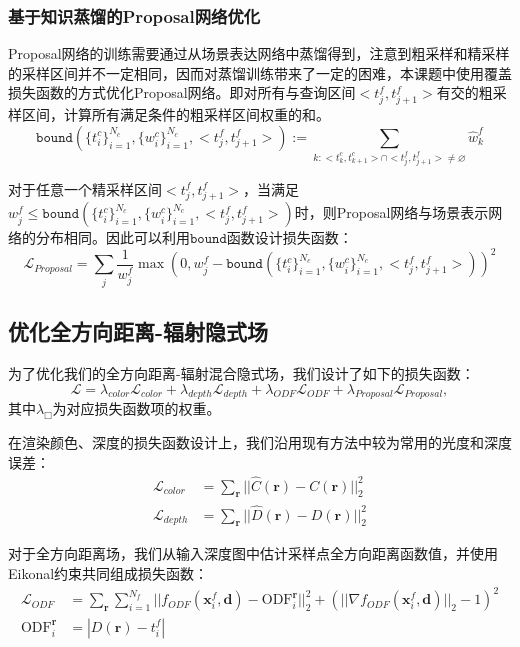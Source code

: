 \subsubsection{基于知识蒸馏的Proposal网络优化}

Proposal网络的训练需要通过从场景表达网络中蒸馏得到，注意到粗采样和精采样的采样区间并不一定相同，因而对蒸馏训练带来了一定的困难，本课题中使用覆盖损失函数的方式优化Proposal网络\cite{barron_mip-nerf_2022}。即对所有与查询区间$<t_{j}^f, t_{j+1}^f>$有交的粗采样区间，计算所有满足条件的粗采样区间权重的和。
\begin{equation}
    \mathtt{bound}(\{t_i^c\}_{i=1}^{N_c}, \{w_i^c\}_{i=1}^{N_c}, <t_{j}^f, t_{j+1}^f>) :=\sum_{k:<t_{k}^c,t_{k+1}^c>\cap<t_{j}^f, t_{j+1}^f>\neq\varnothing}\hat{w}_k^f
\end{equation}

对于任意一个精采样区间$<t_{j}^f, t_{j+1}^f>$，当满足$w_j^f\leq \mathtt{bound}(\{t_i^c\}_{i=1}^{N_c}, \{w_i^c\}_{i=1}^{N_c}, <t_{j}^f, t_{j+1}^f>)$时，则Proposal网络与场景表示网络的分布相同。因此可以利用$\mathtt{bound}$函数设计损失函数：
\begin{equation}
    \mathcal{L}_{Proposal}=\sum_j\frac{1}{w_j^f}\max(0, w_j^f- \mathtt{bound}(\{t_i^c\}_{i=1}^{N_c}, \{w_i^c\}_{i=1}^{N_c}, <t_{j}^f, t_{j+1}^f>))^2
\end{equation}

\subsection{优化全方向距离-辐射隐式场}
为了优化我们的全方向距离-辐射混合隐式场，我们设计了如下的损失函数：
\begin{equation}
    \mathcal{L} = \lambda_{color}\mathcal{L}_{color} + \lambda_{depth}\mathcal{L}_{depth}+\lambda_{ODF}\mathcal{L}_{ODF}+\lambda_{Proposal}\mathcal{L}_{Proposal},
\end{equation}
其中$\lambda_{\Box}$为对应损失函数项的权重。

在渲染颜色、深度的损失函数设计上，我们沿用现有方法\cite{mildenhall_nerf_2020}中较为常用的光度和深度误差：
\begin{align}
    \mathcal{L}_{color} &= \sum_{\mathbf{r}}||\hat{C}(\mathbf{r}) - C(\mathbf{r})||_2^2\\
    \mathcal{L}_{depth} &= \sum_{\mathbf{r}}||\hat{D}(\mathbf{r}) - D(\mathbf{r})||_2^2
\end{align}

对于全方向距离场，我们从输入深度图中估计采样点全方向距离函数值，并使用Eikonal约束\cite{gropp_implicit_2020}共同组成损失函数：
\begin{align}
    \mathcal{L}_{ODF} &= \sum_{\mathbf{r}}\sum_{i=1}^{N_f}||f_{ODF}(\mathbf{x}_i^f, \mathbf{d}) - \text{ODF}_i^{\mathbf{r}}||_2^2 + (||\nabla f_{ODF}(\mathbf{x}_i^f, \mathbf{d})||_2-1)^2\\
    \text{ODF}_i^{\mathbf{r}} &= |D(\mathbf{r}) - t_i^f|
\end{align}

